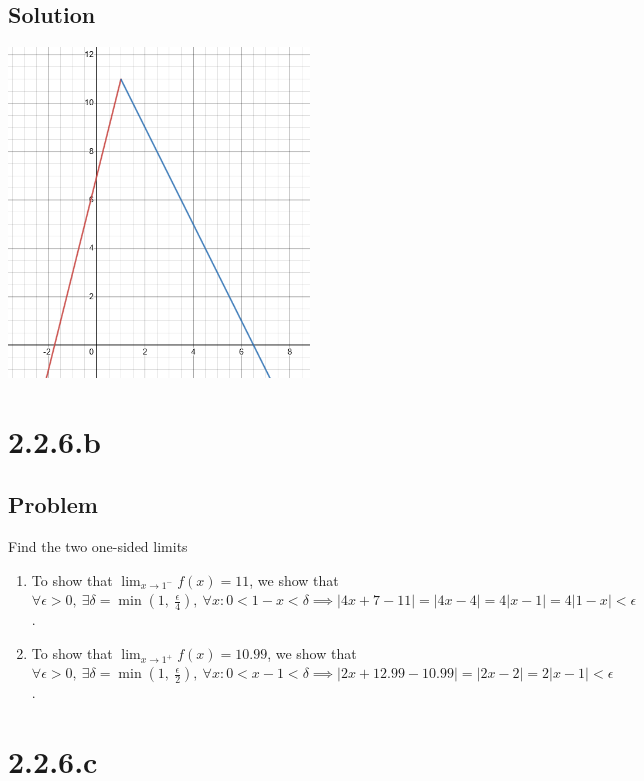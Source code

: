 \documentclass[12pt]{article}
\newcommand{\round}[1]{\left(       #1 \right)      }
\newcommand{\abs}  [1]{\left|       #1 \right|      }
\begin{document}
\subsection*{Solution}
\begin{center}
\includegraphics[width=8cm]{2.2.6}
\end{center}



\section*{2.2.6.b}

\subsection*{Problem}
Find the two one-sided limits

\begin{enumerate}
    \item To show that $\lim_{x \to 1^{-}} f(x) = 11$, we show that $\forall \epsilon > 0,\ \exists \delta = \min\round{1,\ \frac{\epsilon}{4}},\ \forall x : 0 < 1 - x < \delta \implies \abs{4x + 7 - 11} = \abs{4x - 4} = 4\abs{x - 1} = 4 \abs{1 - x} < \epsilon$.
    \item To show that $\lim_{x \to 1^{+}} f(x) = 10.99$, we show that $\forall \epsilon > 0,\ \exists \delta = \min\round{1,\ \frac{\epsilon}{2}},\ \forall x : 0 < x - 1 < \delta \implies \abs{2x + 12.99 - 10.99} = \abs{2x - 2} = 2\abs{x - 1} < \epsilon$.
\end{enumerate}



\section*{2.2.6.c}
\end{document}
